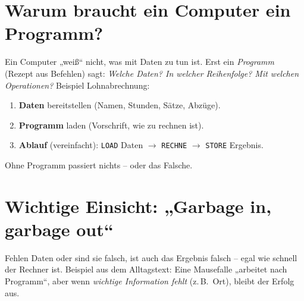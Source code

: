 \documentclass[../skript/main.tex]{subfiles}
\begin{document}
	\section{Warum braucht ein Computer ein Programm?}
	Ein Computer „weiß“ nicht, was mit Daten zu tun ist. Erst ein \emph{Programm} (Rezept aus
	Befehlen) sagt: \emph{Welche Daten? In welcher Reihenfolge? Mit welchen Operationen?}
	Beispiel Lohnabrechnung:
	\begin{enumerate}
		\item \textbf{Daten} bereitstellen (Namen, Stunden, Sätze, Abzüge).
		\item \textbf{Programm} laden (Vorschrift, wie zu rechnen ist).
		\item \textbf{Ablauf} (vereinfacht): \texttt{LOAD} Daten $\rightarrow$ \texttt{RECHNE} $\rightarrow$ \texttt{STORE} Ergebnis.
	\end{enumerate}
	Ohne Programm passiert nichts – oder das Falsche.
	
	\section{Wichtige Einsicht: „Garbage in, garbage out“}
	Fehlen Daten oder sind sie falsch, ist auch das Ergebnis falsch – egal wie schnell der Rechner
	ist. Beispiel aus dem Alltagstext: Eine Mausefalle „arbeitet nach Programm“, aber wenn
	\emph{wichtige Information fehlt} (z.\,B.\ Ort), bleibt der Erfolg aus.
	
\end{document}
